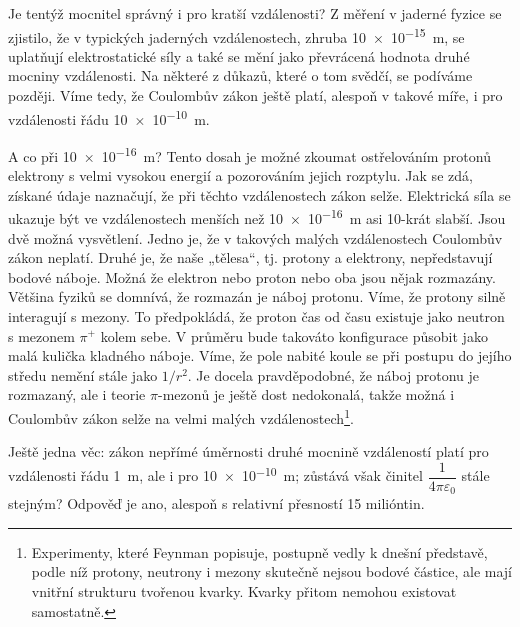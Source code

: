   Je tentýž mocnitel správný i pro kratší vzdálenosti? Z měření v jaderné fyzice se zjistilo, 
  že v typických jaderných vzdálenostech, zhruba \SI{10e-15}{\meter}, se uplatňují 
  elektrostatické síly a také se mění jako převrácená hodnota druhé mocniny vzdálenosti. Na 
  některé z důkazů, které o tom svědčí, se podíváme později. Víme tedy, že Coulombův zákon 
  ještě platí, alespoň v takové míře, i pro vzdálenosti řádu \SI{10e-10}{\meter}.
  
  A co při \SI{10e-16}{\meter}? Tento dosah je možné zkoumat ostřelováním protonů elektrony s 
  velmi vysokou energií a pozorováním jejich rozptylu. Jak se zdá, získané údaje naznačují, že 
  při těchto vzdálenostech zákon selže. Elektrická síla se ukazuje být ve vzdálenostech menších 
  než \SI{10e-16}{\meter} asi 10-krát slabší. Jsou dvě možná vysvětlení. Jedno je, že v 
  takových malých vzdálenostech Coulombův zákon neplatí. Druhé je, že naše „tělesa“, tj. 
  protony a elektrony, nepředstavují bodové náboje. Možná že elektron nebo proton nebo oba jsou 
  nějak rozmazány. Většina fyziků se domnívá, že rozmazán je náboj protonu. Víme, že protony 
  silně interagují s mezony. To předpokládá, že proton čas od času existuje jako neutron s 
  mezonem \(\pi^+\) kolem sebe. V průměru bude takováto konfigurace působit jako malá kulička 
  kladného náboje. Víme, že pole nabité koule se při postupu do jejího středu nemění stále jako 
  \(1/r^2\). Je docela pravděpodobné, že náboj protonu je rozmazaný, ale i teorie 
  \(\pi\text{-mezonů}\) je ještě dost nedokonalá, takže možná i Coulombův zákon selže na velmi 
  malých vzdálenostech\footnote{Experimenty, které Feynman popisuje, postupně vedly k dnešní 
  představě, podle níž protony, neutrony i mezony skutečně nejsou bodové částice, ale mají 
  vnitřní strukturu tvořenou kvarky. Kvarky přitom nemohou existovat samostatně.}.
  
  Ještě jedna věc: zákon nepřímé úměrnosti druhé mocnině vzdáleností platí pro vzdálenosti řádu 
  \SI{1}{\meter}, ale i pro \newline\SI{10e-10}{\meter}; zůstává však činitel 
  \(\dfrac{1}{4\pi\varepsilon_0}\) stále stejným? Odpověď je ano, alespoň s relativní přesností 
  15 milióntin.
  
